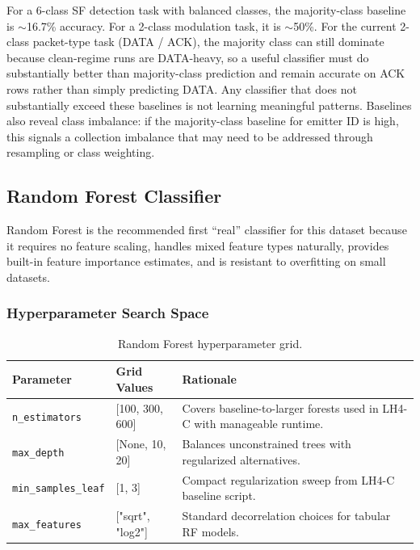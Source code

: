 \documentclass[11pt,letterpaper]{article}
\begin{document}
	\begin{tcolorbox}[infobox={Why Baselines Matter}]
		For a 6-class SF detection task with balanced classes, the majority-class baseline is $\sim$16.7\% accuracy. For a 2-class modulation task, it is $\sim$50\%. For the current 2-class packet-type task (DATA / ACK), the majority class can still dominate because clean-regime runs are DATA-heavy, so a useful classifier must do substantially better than majority-class prediction and remain accurate on ACK rows rather than simply predicting DATA. Any classifier that does not substantially exceed these baselines is not learning meaningful patterns. Baselines also reveal class imbalance: if the majority-class baseline for emitter ID is high, this signals a collection imbalance that may need to be addressed through resampling or class weighting.
	\end{tcolorbox}

	\subsection{Random Forest Classifier}

	Random Forest is the recommended first ``real'' classifier for this dataset because it requires no feature scaling, handles mixed feature types naturally, provides built-in feature importance estimates, and is resistant to overfitting on small datasets.

	\subsubsection{Hyperparameter Search Space}

	\begin{table}[ht!]
		\centering
		\caption{Random Forest hyperparameter grid.}
		\label{tab:rf_grid}
		\renewcommand{\arraystretch}{1.3}
		\begin{tabularx}{\textwidth}{l l X}
			\toprule
			\textbf{Parameter} & \textbf{Grid Values} & \textbf{Rationale} \\
			\midrule
			\texttt{n\_estimators} & [100, 300, 600] & Covers baseline-to-larger forests used in LH4-C with manageable runtime. \\
			\texttt{max\_depth} & [None, 10, 20] & Balances unconstrained trees with regularized alternatives. \\
			\texttt{min\_samples\_leaf} & [1, 3] & Compact regularization sweep from LH4-C baseline script. \\
			\texttt{max\_features} & ["sqrt", "log2"] & Standard decorrelation choices for tabular RF models. \\
			\bottomrule
		\end{tabularx}
	\end{table}
\end{document}
